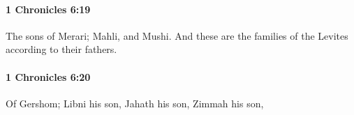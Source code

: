 		\paragraph{1 Chronicles 6:19} %
			\label{1CHRONICLES-6-19}

			The sons of Merari; Mahli, and Mushi. And these are the families of the Levites according to their fathers.


		\paragraph{1 Chronicles 6:20} %
			\label{1CHRONICLES-6-20}

			Of Gershom; Libni his son, Jahath his son, Zimmah his son,


